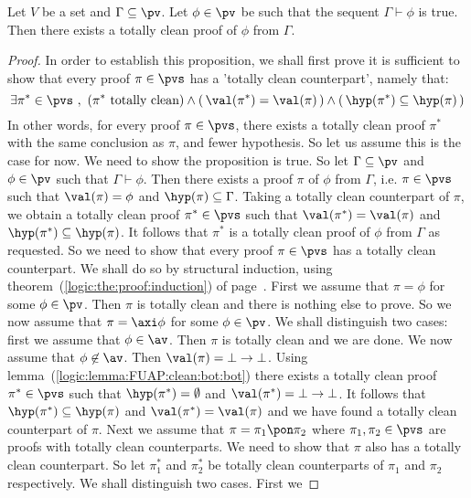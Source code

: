 \begin{prop}\label{logic:prop:FUAP:clean:counterpart}
Let $V$ be a set and $\Gamma\subseteq\pv$. Let $\phi\in\pv$ be such
that the sequent $\Gamma\vdash\phi$ is true. Then there exists a
totally clean proof of $\phi$ from $\Gamma$.
\end{prop}
\begin{proof}
In order to establish this proposition, we shall first prove it is
sufficient to show that every proof $\pi\in\pvs$ has a 'totally
clean counterpart', namely that:
    \[
    \exists\pi^{*}\in\pvs\ ,\ (\pi^{*}\mbox{ totally clean})
    \land(\,\val(\pi^{*})=\val(\pi)\,)\land(\,\hyp(\pi^{*})\subseteq\hyp(\pi)\,)
    \]
In other words, for every proof $\pi\in\pvs$, there exists a totally
clean proof $\pi^{*}$ with the same conclusion as $\pi$, and fewer
hypothesis. So let us assume this is the case for now. We need to
show the proposition is true. So let $\Gamma\subseteq\pv$ and
$\phi\in\pv$ such that $\Gamma\vdash\phi$. Then there exists a proof
$\pi$ of $\phi$ from $\Gamma$, i.e. $\pi\in\pvs$ such that
$\val(\pi)=\phi$ and $\hyp(\pi)\subseteq\Gamma$. Taking a totally
clean counterpart of $\pi$, we obtain a totally clean proof
$\pi^{*}\in\pvs$ such that $\val(\pi^{*})=\val(\pi)$ and
$\hyp(\pi^{*})\subseteq\hyp(\pi)$. It follows that $\pi^{*}$ is a
totally clean proof of $\phi$ from $\Gamma$ as requested. So we need
to show that every proof $\pi\in\pvs$ has a totally clean
counterpart. We shall do so by structural induction, using
theorem~(\ref{logic:the:proof:induction}) of
page~\pageref{logic:the:proof:induction}. First we assume that
$\pi=\phi$ for some $\phi\in\pv$. Then $\pi$ is totally clean and
there is nothing else to prove. So we now assume that $\pi=\axi\phi$
for some $\phi\in\pv$. We shall distinguish two cases: first we
assume that $\phi\in\av$. Then $\pi$ is totally clean and we are
done. We now assume that $\phi\not\in\av$. Then
$\val(\pi)=\bot\to\bot$. Using
lemma~(\ref{logic:lemma:FUAP:clean:bot:bot}) there exists a totally
clean proof $\pi^{*}\in\pvs$ such that $\hyp(\pi^{*})=\emptyset$ and
$\val(\pi^{*})=\bot\to\bot$. It follows that
$\hyp(\pi^{*})\subseteq\hyp(\pi)$ and $\val(\pi^{*})=\val(\pi)$ and
we have found a totally clean counterpart of $\pi$. Next we assume
that $\pi=\pi_{1}\pon\pi_{2}$ where $\pi_{1},\pi_{2}\in\pvs$ are
proofs with totally clean counterparts. We need to show that $\pi$
also has a totally clean counterpart. So let $\pi_{1}^{*}$ and
$\pi_{2}^{*}$ be totally clean counterparts of $\pi_{1}$ and
$\pi_{2}$ respectively. We shall distinguish two cases. First we

\end{proof}
